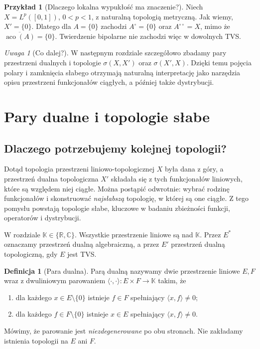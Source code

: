 \documentclass[11pt,a4paper]{article}
\numberwithin{equation}{section}
\theoremstyle{plain}
\theoremstyle{definition}
\newtheorem{definicja}[twierdzenie]{Definicja}
\newtheorem{przyklad}[twierdzenie]{Przykład}
\theoremstyle{remark}
\newtheorem{uwaga}[twierdzenie]{Uwaga}
\newcommand{\R}{\mathbb R}
\newcommand{\C}{\mathbb C}
\newcommand{\K}{\mathbb K}
\begin{document}
\begin{przyklad}[Dlaczego lokalna wypukłość ma znaczenie?]
Niech $X=L^p([0,1])$, $0<p<1$, z naturalną topologią
metryczną. Jak wiemy, $X'=\{0\}$. Dlatego dla
$A=\{0\}$ zachodzi $A^\circ=\{0\}$ oraz
$A^{\circ\circ}=X$, mimo że
$\overline{\operatorname{aco}(A)}=\{0\}$.
Twierdzenie bipolarne nie zachodzi więc w dowolnych TVS.
\end{przyklad}

\begin{uwaga}[Co dalej?]
W następnym rozdziale szczegółowo zbadamy pary
przestrzeni dualnych i topologie $\sigma(X,X')$ oraz
$\sigma(X',X)$. Dzięki temu pojęcia polary i
zamknięcia słabego otrzymają naturalną interpretację
jako narzędzia opisu przestrzeni funkcjonałów ciągłych,
a później także dystrybucji.
\end{uwaga}


\setcounter{section}{7}
\section{Pary dualne i topologie słabe}\label{sec:topologie-slabe}

\subsection{Dlaczego potrzebujemy kolejnej topologii?}

Dotąd topologia przestrzeni liniowo-topologicznej $X$ była dana z góry,
a przestrzeń dualna topologiczna $X'$ składała się z tych
funkcjonałów liniowych, które są względem niej ciągłe.
Można postąpić odwrotnie: wybrać rodzinę funkcjonałów i skonstruować
\emph{najsłabszą} topologię, w której są one ciągłe.
Z tego pomysłu powstają topologie słabe, kluczowe w badaniu zbieżności
funkcji, operatorów i dystrybucji.

W rozdziale $\K\in\{\R,\C\}$. Wszystkie przestrzenie liniowe
są nad $\K$. Przez $E^*$ oznaczamy przestrzeń dualną algebraiczną,
a przez $E'$ przestrzeń dualną topologiczną, gdy $E$ jest TVS.

\begin{definicja}[Para dualna]\label{def:para-dualna}
Parą dualną nazywamy dwie przestrzenie liniowe $E,F$ wraz
z dwuliniowym parowaniem $\langle\cdot,\cdot\rangle:E\times F\to\K$
takim, że
\begin{enumerate}
\item dla każdego $x\in E\setminus\{0\}$ istnieje $f\in F$
      spełniający $\langle x,f\rangle\ne0$;
\item dla każdego $f\in F\setminus\{0\}$ istnieje $x\in E$
      spełniający $\langle x,f\rangle\ne0$.
\end{enumerate}
Mówimy, że parowanie jest \emph{niezdegenerowane} po obu stronach.
Nie zakładamy istnienia topologii na $E$ ani $F$.
\end{definicja}
\end{document}
